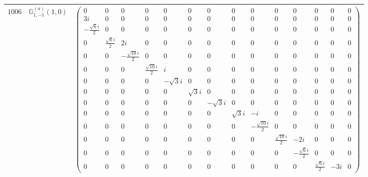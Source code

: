 \documentclass[fleqn,8pt,landscape]{jsarticle}
\begin{document}
\begin{center}
\begin{longtable}{ccc}
$ 1006 $ & $ \mathbb{G}_{1,-1}^{(a)}(1,0) $ & $ \begin{pmatrix} 0 & 0 & 0 & 0 & 0 & 0 & 0 & 0 & 0 & 0 & 0 & 0 & 0 & 0 \\ 3 i & 0 & 0 & 0 & 0 & 0 & 0 & 0 & 0 & 0 & 0 & 0 & 0 & 0 \\ - \frac{\sqrt{6} i}{2} & 0 & 0 & 0 & 0 & 0 & 0 & 0 & 0 & 0 & 0 & 0 & 0 & 0 \\ 0 & \frac{\sqrt{6} i}{2} & 2 i & 0 & 0 & 0 & 0 & 0 & 0 & 0 & 0 & 0 & 0 & 0 \\ 0 & 0 & - \frac{\sqrt{10} i}{2} & 0 & 0 & 0 & 0 & 0 & 0 & 0 & 0 & 0 & 0 & 0 \\ 0 & 0 & 0 & \frac{\sqrt{10} i}{2} & i & 0 & 0 & 0 & 0 & 0 & 0 & 0 & 0 & 0 \\ 0 & 0 & 0 & 0 & - \sqrt{3} i & 0 & 0 & 0 & 0 & 0 & 0 & 0 & 0 & 0 \\ 0 & 0 & 0 & 0 & 0 & \sqrt{3} i & 0 & 0 & 0 & 0 & 0 & 0 & 0 & 0 \\ 0 & 0 & 0 & 0 & 0 & 0 & - \sqrt{3} i & 0 & 0 & 0 & 0 & 0 & 0 & 0 \\ 0 & 0 & 0 & 0 & 0 & 0 & 0 & \sqrt{3} i & - i & 0 & 0 & 0 & 0 & 0 \\ 0 & 0 & 0 & 0 & 0 & 0 & 0 & 0 & - \frac{\sqrt{10} i}{2} & 0 & 0 & 0 & 0 & 0 \\ 0 & 0 & 0 & 0 & 0 & 0 & 0 & 0 & 0 & \frac{\sqrt{10} i}{2} & - 2 i & 0 & 0 & 0 \\ 0 & 0 & 0 & 0 & 0 & 0 & 0 & 0 & 0 & 0 & - \frac{\sqrt{6} i}{2} & 0 & 0 & 0 \\ 0 & 0 & 0 & 0 & 0 & 0 & 0 & 0 & 0 & 0 & 0 & \frac{\sqrt{6} i}{2} & - 3 i & 0 \end{pmatrix} $ \\ \hline

\end{longtable}
\end{center}
\end{document}

